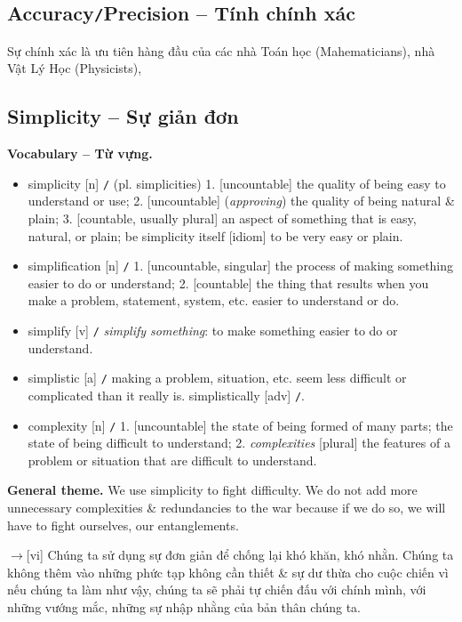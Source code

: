 \documentclass[12pt,twoside]{book}
\begin{document}
\subsection{Accuracy{\tt/}Precision -- Tính chính xác}
Sự chính xác là ưu tiên hàng đầu của các nhà Toán học (Mahematicians), nhà Vật Lý Học (Physicists), 

\subsection{Simplicity -- Sự giản đơn}
\textbf{\textsf{\small Vocabulary -- Từ vựng.}}
\begin{itemize}\small
	\item {\sf simplicity} [n] {\tt/} (pl. simplicities) 1. [uncountable] the quality of being easy to understand or use; 2. [uncountable] ({\it approving}) the quality of being natural \& plain; 3. [countable, usually plural] an aspect of something that is easy, natural, or plain; {\sf be simplicity itself} [idiom] to be very easy or plain.
	\item {\sf simplification} [n] {\tt/} 1. [uncountable, singular] the process of making something easier to do or understand; 2. [countable] the thing that results when you make a problem, statement, system, etc. easier to understand or do.
	\item {\sf simplify} [v] {\tt/} {\it simplify something}: to make something easier to do or understand.
	\item {\sf simplistic} [a] {\tt/} making a problem, situation, etc. seem less difficult or complicated than it really is. {\sf simplistically} [adv] {\tt/}.
	\item {\sf complexity} [n] {\tt/} 1. [uncountable] the state of being formed of many parts; the state of being difficult to understand; 2. {\it complexities} [plural] the features of a problem or situation that are difficult to understand.
\end{itemize}
{\bf General theme.} We use simplicity to fight difficulty. We do not add more unnecessary complexities \& redundancies to the war because if we do so, we will have to fight ourselves, our entanglements.

{\sf[en]$\to$[vi]} Chúng ta sử dụng sự đơn giản để chống lại khó khăn, khó nhằn. Chúng ta không thêm vào những phức tạp không cần thiết \& sự dư thừa cho cuộc chiến vì nếu chúng ta làm như vậy, chúng ta sẽ phải tự chiến đấu với chính mình, với những vướng mắc, những sự nhập nhằng của bản thân chúng ta.
\end{document}
